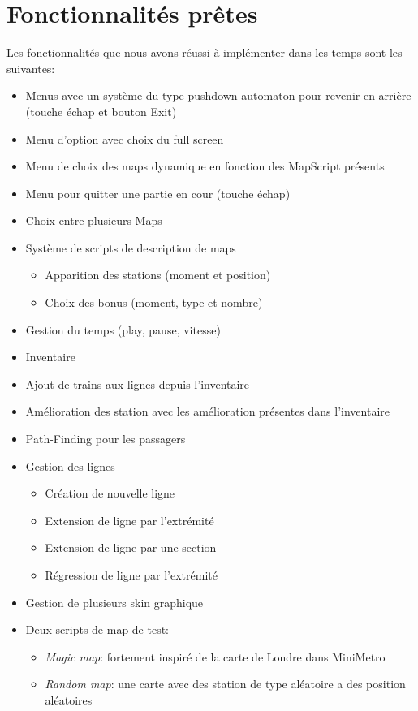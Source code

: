 \documentclass[report, backcover, french, nodocumentinfo]{upmethodology-document}
\begin{document}
	\section{Fonctionnalités prêtes}
		\p{}
		Les fonctionnalités que nous avons réussi à implémenter dans les temps sont les suivantes:
		\begin{itemize}
			\item Menus avec un système du type pushdown automaton pour revenir en arrière (touche échap et bouton Exit)
			\item Menu d'option avec choix du full screen
			\item Menu de choix des maps dynamique en fonction des MapScript présents
			\item Menu pour quitter une partie en cour (touche échap)
			\item Choix entre plusieurs Maps
			\item Système de scripts de description de maps
				\begin{itemize}
					\item Apparition des stations (moment et position)
					\item Choix des bonus (moment, type et nombre)
				\end{itemize}
			\item Gestion du temps (play, pause, vitesse)
			\item Inventaire
			\item Ajout de trains aux lignes depuis l'inventaire
			\item Amélioration des station avec les amélioration présentes dans l'inventaire
			\item Path-Finding pour les passagers
			\item Gestion des lignes
				\begin{itemize}
					\item Création de nouvelle ligne
					\item Extension de ligne par l'extrémité
					\item Extension de ligne par une section
					\item Régression de ligne par l'extrémité
				\end{itemize}
			\item Gestion de plusieurs skin graphique
			\item Deux scripts de map de test:
				\begin{itemize}
					\item \textit{Magic map}: fortement inspiré de la carte de Londre dans MiniMetro
					\item \textit{Random map}: une carte avec des station de type aléatoire a des position aléatoires
				\end{itemize}
		\end{itemize}
\end{document}
